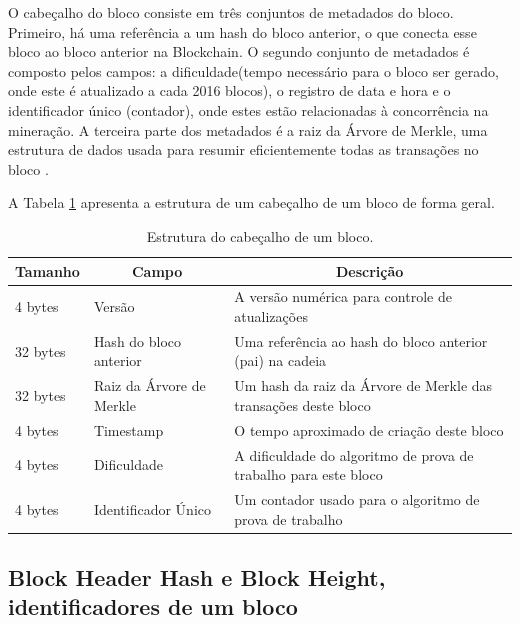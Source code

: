     O cabeçalho do bloco consiste em três conjuntos de metadados do bloco. Primeiro, há uma referência a um hash do bloco anterior, o que conecta esse bloco ao bloco anterior na Blockchain. O segundo conjunto de metadados é composto pelos campos: a dificuldade(tempo necessário para o bloco ser gerado, onde este é atualizado a cada 2016 blocos), o registro de data e hora e o identificador único (contador), onde estes estão relacionadas à concorrência na mineração. A terceira parte dos metadados é a raiz da Árvore de Merkle, uma estrutura de dados usada para resumir eficientemente todas as transações no bloco \cite{mastering_blockchain_andreas}.

    A Tabela \ref{tabela_estrutura_cabecalho_de_um_bloco} apresenta a estrutura de um cabeçalho de um bloco de forma geral.
    

    \begin{table}[h]
        \centering
        \caption{Estrutura do cabeçalho de um bloco.}
        \begin{adjustbox}{width=\textwidth}
            \begin{tabular}{|l|l|l|}
            \hline
            \multicolumn{1}{|c|}{\textbf{Tamanho}} & \multicolumn{1}{c|}{\textbf{Campo}} & \multicolumn{1}{c|}{\textbf{Descrição}} \\ \hline
             4 bytes & Versão   & A versão numérica para controle de atualizações  \\ \hline
             32 bytes & Hash do bloco anterior   & Uma referência ao hash do bloco anterior (pai) na cadeia \\ \hline
             32 bytes & Raiz da Árvore de Merkle    & Um hash da raiz da Árvore de Merkle das transações deste bloco  \\ \hline
             4 bytes  & Timestamp  & O tempo aproximado de criação deste bloco  \\ \hline
             4 bytes  & Dificuldade  & A dificuldade do algoritmo de prova de trabalho para este bloco  \\ \hline
             4 bytes  & Identificador Único  & Um contador usado para o algoritmo de prova de trabalho  \\ \hline
            \end{tabular}
        \end{adjustbox}
        \label{tabela_estrutura_cabecalho_de_um_bloco}
    \end{table}




    \subsection{Block Header Hash e Block Height, identificadores de um bloco}
    
